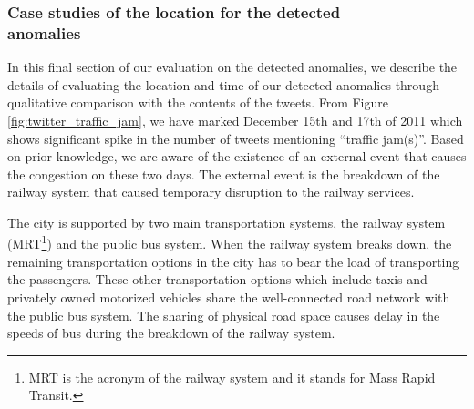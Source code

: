 \documentclass[conference]{IEEEtran.1.8}
\begin{document}
\subsubsection{Case studies of the location for the detected\\anomalies}

In this final section of our evaluation on the detected anomalies, we describe the details of evaluating the location and time of our detected anomalies through qualitative comparison with the contents of the tweets. From Figure \ref{fig:twitter_traffic_jam}, we have marked December 15th and 17th of 2011 which shows significant spike in the number of tweets mentioning ``traffic jam(s)''. Based on prior knowledge, we are aware of the existence of an external event that causes the congestion on these two days. The external event is the breakdown of the railway system that caused temporary disruption to the railway services.

The city is supported by two main transportation systems, the railway system (MRT\footnote{MRT is the acronym of the railway system and it stands for Mass Rapid Transit.}) and the public bus system. When the railway system breaks down, the remaining transportation options in the city has to bear the load of transporting the passengers. These other transportation options which include taxis and privately owned motorized vehicles share the well-connected road network with the public bus system. The sharing of physical road space causes delay in the speeds of bus during the breakdown of the railway system. 
\end{document}
